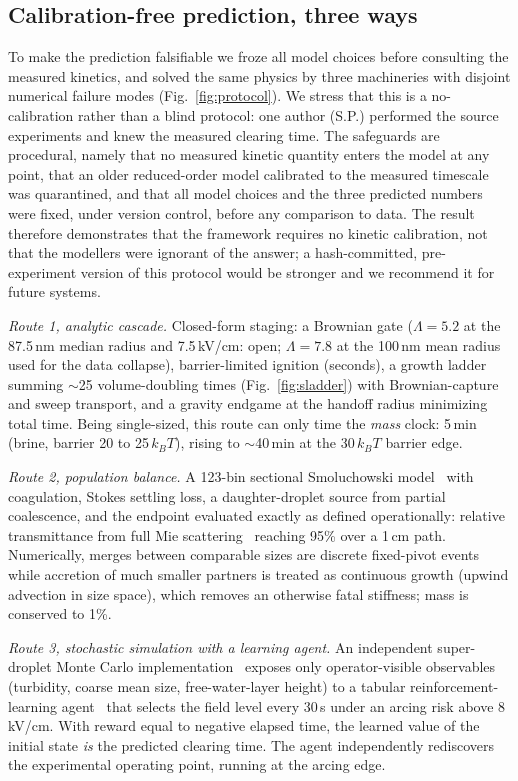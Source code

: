 \documentclass[aps,prfluids,reprint,amsmath,amssymb,superscriptaddress,longbibliography]{revtex4-2}
\begin{document}
\subsection{Calibration-free prediction, three ways}

To make the prediction falsifiable we froze all model choices before
consulting the measured kinetics, and solved the same physics by three
machineries with disjoint numerical failure modes
(Fig.~\ref{fig:protocol}). We stress that this is a no-calibration rather
than a blind protocol: one author (S.P.) performed the source experiments
and knew the measured clearing time. The safeguards are procedural, namely
that no measured kinetic quantity enters the model at any point, that an
older reduced-order model calibrated to the measured timescale was
quarantined, and that all model choices and the three predicted numbers
were fixed, under version control, before any comparison to data. The
result therefore demonstrates that the framework requires no kinetic
calibration, not that the modellers were ignorant of the answer; a
hash-committed, pre-experiment version of this protocol would be stronger
and we recommend it for future systems.

\emph{Route 1, analytic cascade.} Closed-form staging: a Brownian gate
($\Lambda=5.2$ at the 87.5\,nm median radius and 7.5\,kV/cm: open;
$\Lambda=7.8$ at the 100\,nm mean radius used for the data collapse), barrier-limited ignition
(seconds), a growth ladder summing $\sim$25 volume-doubling times
(Fig.~\ref{fig:sladder}) with
Brownian-capture and sweep transport, and a gravity endgame at the handoff
radius minimizing total time. Being single-sized, this route can only time the \emph{mass} clock:
5\,min (brine, barrier 20 to 25\,$k_BT$), rising to $\sim$40\,min at the
30\,$k_BT$ barrier edge.

\emph{Route 2, population balance.} A 123-bin sectional
Smoluchowski model~\cite{smoluchowski1917,kumar1996} with coagulation,
Stokes settling loss, a daughter-droplet source from partial coalescence,
and the endpoint evaluated exactly as defined operationally: relative
transmittance from full Mie scattering~\cite{bohren1983} reaching 95\% over
a 1\,cm path. Numerically, merges between comparable sizes are discrete
fixed-pivot events while accretion of much smaller partners is treated as
continuous growth (upwind advection in size space), which removes an
otherwise fatal stiffness; mass is conserved to 1\%.

\emph{Route 3, stochastic simulation with a learning agent.} An independent
super-droplet Monte Carlo implementation~\cite{shima2009} exposes only
operator-visible observables (turbidity, coarse mean size, free-water-layer
height) to a tabular reinforcement-learning agent~\cite{sutton2018} that
selects the field level every 30\,s under an arcing risk above 8\,kV/cm.
With reward equal to negative elapsed time, the learned value of the initial
state \emph{is} the predicted clearing time. The agent independently
rediscovers the experimental operating point, running at the arcing edge.
\end{document}
